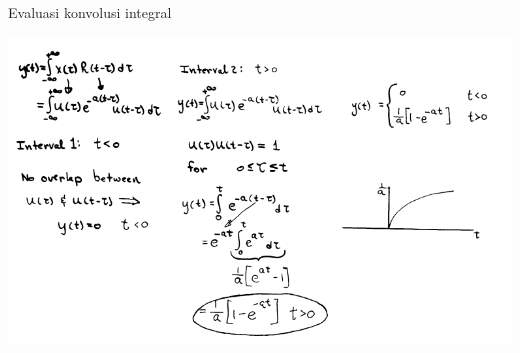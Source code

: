 \documentclass[aspectratio=169]{beamer}
\begin{document}
\begin{frame}{Evaluasi konvolusi integral}
	\begin{center}
		\includegraphics[height=0.8\textheight]{gambar/03.konvolusi/mk.4.03}
	\end{center}
\end{frame}
\end{document}
